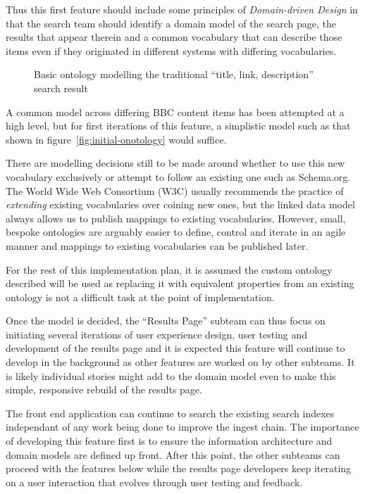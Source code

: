 Thus this first feature should include some principles of
\emph{Domain-driven Design}\cite{evans2004domain}
in that the search team should identify
a domain model of the search page, the results that appear therein
and a common vocabulary that can describe those items even if
they originated in different systems with differing vocabularies.

\begin{figure}
  \begin{center}
    \begin{dot2tex}[dot,pgf,scale=0.41]
      
    \end{dot2tex}
  \end{center}
  \caption{Basic ontology modelling the traditional ``title, link, description'' search result}
  \label{fig:initial-ontology}
\end{figure}

A common model across differing BBC content items has been
attempted\cite{fenning2014applicability} at a high level, but
for first iterations of this feature, a simplistic model
such as that shown in figure~\ref{fig:initial-onotology}
would suffice.

There are modelling decisions still to be
made around whether to use this new vocabulary exclusively
or attempt to follow an existing one such as Schema.org. The
World Wide Web Consortium (W3C) usually recommends the practice
of \emph{extending} existing vocabularies over coining new
ones, but the linked data model always allows us to publish
mappings to existing vocabularies. However, small, bespoke
ontologies are arguably easier to define, control and iterate
in an agile manner and mappings to existing vocabularies
can be published later.

For the rest of this implementation plan, it is assumed
the custom ontology described will be used as replacing it
with equivalent properties from an existing ontology
is not a difficult task at the point of implementation.

Once the model is decided,
the ``Results Page'' subteam can thus focus on initiating
several iterations of user experience design, user testing
and development of the results page and it is expected this
feature will continue to develop in the background as
other features are worked on by other subteams. It is likely
individual stories might add to the domain model even
to make this simple, responsive rebuild of the results page.

The front end application can continue to search the
existing search indexes independant of any work being done
to improve the ingest chain. The importance of developing
this feature first is to ensure the information architecture
and domain models are defined up front. After this point,
the other subteams can proceed with the features below
while the results page developers keep iterating on
a user interaction that evolves through user testing and
feedback.

